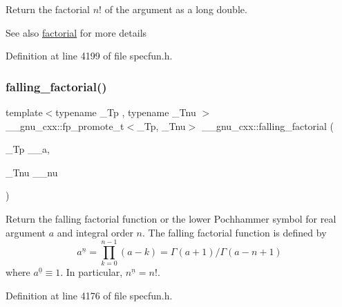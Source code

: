 Return the factorial $ n! $ of the argument as a {\ttfamily long double}.

\begin{DoxySeeAlso}{See also}
\hyperlink{group__gnu__math__spec__func_ga963b1612f50b0964f5f42c9f289aab68}{factorial} for more details 
\end{DoxySeeAlso}


Definition at line 4199 of file specfun.\+h.

\mbox{\label{group__gnu__math__spec__func_ga3cc8eb6068c7155ec48b40e20160c5c0}} 
\subsubsection{\texorpdfstring{falling\+\_\+factorial()}{falling\_factorial()}}
{\footnotesize\ttfamily template$<$typename \+\_\+\+Tp , typename \+\_\+\+Tnu $>$ \\
\+\_\+\+\_\+gnu\+\_\+cxx\+::fp\+\_\+promote\+\_\+t$<$\+\_\+\+Tp, \+\_\+\+Tnu$>$ \+\_\+\+\_\+gnu\+\_\+cxx\+::falling\+\_\+factorial (\begin{DoxyParamCaption}\item[{\+\_\+\+Tp}]{\+\_\+\+\_\+a,  }\item[{\+\_\+\+Tnu}]{\+\_\+\+\_\+nu }\end{DoxyParamCaption})\hspace{0.3cm}{\ttfamily [inline]}}



Return the falling factorial function or the lower Pochhammer symbol for real argument $ a $ and integral order $ n $. The falling factorial function is defined by \[ a^{\underline{n}} = \prod_{k=0}^{n-1} (a - k) = \Gamma(a + 1) / \Gamma(a - n + 1) \] where $ a^{\underline{0}} \equiv 1 $. In particular, $ n^{\underline{n}} = n! $. 



Definition at line 4176 of file specfun.\+h.

\mbox{\label{group__gnu__math__spec__func_gaf32abbc790bfa870725728e5470de532}} 
